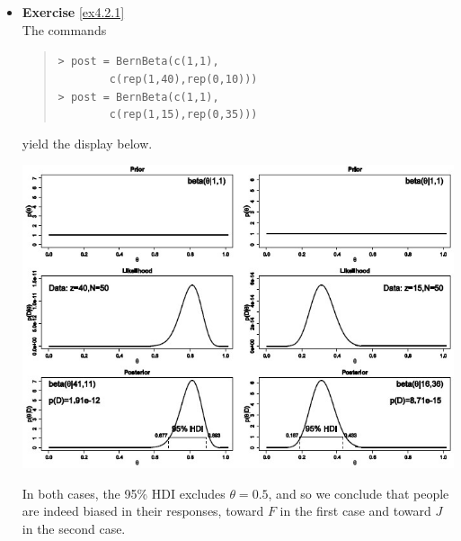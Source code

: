 \begin{itemize}
\item \textbf{Exercise }\ref{ex4.2.1} \\
The commands 
\begin{quote}
\small \texttt{> post = BernBeta(c(1,1),  \\ 
\ \ \ \ \ \ \ \  c(rep(1,40),rep(0,10)))}\\
\texttt{> post = BernBeta(c(1,1),    \\
\ \ \ \ \ \ \ \   c(rep(1,15),rep(0,35)))} \normalsize
\end{quote}
yield the display below.
\begin{center}
		\includegraphics[width=\linewidth]{Images/exsection4.png}
\end{center}
In both cases, the 95\% HDI excludes $\theta=0.5$, and so we conclude that people are indeed biased in their responses, toward $F$ in the first case and toward $J$ in the second case. 
\end{itemize}